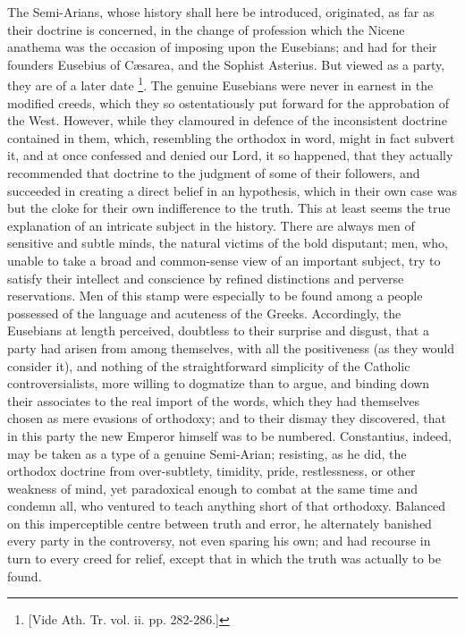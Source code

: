 The Semi-Arians, whose history shall here be introduced,
originated, as far as their doctrine is concerned, in the change of
profession which the Nicene anathema was the occasion of imposing upon
the Eusebians; and had for their founders Eusebius of Cæsarea, and
the Sophist Asterius. But viewed as a party, they are of a later date
\footnote{[Vide Ath. Tr. vol. ii. pp. 282-286.]}. The genuine Eusebians
were never in earnest in the modified creeds, which they so
ostentatiously put forward for the approbation of the West. However,
while they clamoured in defence of the inconsistent doctrine contained
in them, which, resembling the orthodox in word, might in fact subvert
it, and at once confessed and denied our Lord, it so happened, that
they actually recommended that doctrine to the judgment of some of
their followers, and succeeded in creating a direct belief in an
hypothesis, which in their own case was but the cloke for their own
indifference to the truth. This at least seems the true explanation of
an intricate subject in the history. There are always men of sensitive
and subtle minds, the natural victims of the bold disputant; men, who,
unable to take a broad and common-sense view of an important subject,
try to satisfy their intellect and conscience by refined distinctions
and perverse reservations. Men of this stamp were especially to be
found among a people possessed of the language and acuteness of
the Greeks. Accordingly, the Eusebians at length perceived, doubtless
to their surprise and disgust, that a party had arisen from among
themselves, with all the positiveness (as they would consider it), and
nothing of the straightforward simplicity of the Catholic
controversialists, more willing to dogmatize than to argue, and
binding down their associates to the real import of the words, which
they had themselves chosen as mere evasions of orthodoxy; and to their
dismay they discovered, that in this party the new Emperor himself was
to be numbered. Constantius, indeed, may be taken as a type of a
genuine Semi-Arian; resisting, as he did, the orthodox doctrine from
over-subtlety, timidity, pride, restlessness, or other weakness of
mind, yet paradoxical enough to combat at the same time and condemn
all, who ventured to teach anything short of that orthodoxy. Balanced
on this imperceptible centre between truth and error, he alternately
banished every party in the controversy, not even sparing his own; and
had recourse in turn to every creed for relief, except that in which
the truth was actually to be found.

